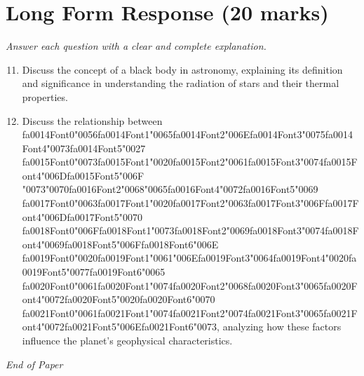 \documentclass[12pt]{article}
\begin{document}
\section*{Long Form Response (20 marks)}
\textit{Answer each question with a clear and complete explanation.}
\begin{enumerate}[label=\arabic*.]
\setcounter{enumi}{10}
\item Discuss the concept of a black body in astronomy, explaining its definition and
significance in understanding the radiation of stars and their thermal properties.
\item Discuss the relationship between {\csname fa0014Font0\endcsname\char"0056}{\csname fa0014Font1\endcsname\char"0065}{\csname fa0014Font2\endcsname\char"006E}{\csname fa0014Font3\endcsname\char"0075}{\csname fa0014Font4\endcsname\char"0073}{\csname fa0014Font5\endcsname\char"0027} {\csname fa0015Font0\endcsname\char"0073}{\csname fa0015Font1\endcsname\char"0020}{\csname fa0015Font2\endcsname\char"0061}{\csname fa0015Font3\endcsname\char"0074}{\csname fa0015Font4\endcsname\char"006D}{\csname fa0015Font5\endcsname\char"006F} {\char"0073}{\char"0070}{\csname fa0016Font2\endcsname\char"0068}{\char"0065}{\csname fa0016Font4\endcsname\char"0072}{\csname fa0016Font5\endcsname\char"0069} {\csname fa0017Font0\endcsname\char"0063}{\csname fa0017Font1\endcsname\char"0020}{\csname fa0017Font2\endcsname\char"0063}{\csname fa0017Font3\endcsname\char"006F}{\csname fa0017Font4\endcsname\char"006D}{\csname fa0017Font5\endcsname\char"0070} {\csname fa0018Font0\endcsname\char"006F}{\csname fa0018Font1\endcsname\char"0073}{\csname fa0018Font2\endcsname\char"0069}{\csname fa0018Font3\endcsname\char"0074}{\csname fa0018Font4\endcsname\char"0069}{\csname fa0018Font5\endcsname\char"006F}{\csname fa0018Font6\endcsname\char"006E} {\csname fa0019Font0\endcsname\char"0020}{\csname fa0019Font1\endcsname\char"0061}{\char"006E}{\csname fa0019Font3\endcsname\char"0064}{\csname fa0019Font4\endcsname\char"0020}{\csname fa0019Font5\endcsname\char"0077}{\csname fa0019Font6\endcsname\char"0065} {\csname fa0020Font0\endcsname\char"0061}{\csname fa0020Font1\endcsname\char"0074}{\csname fa0020Font2\endcsname\char"0068}{\csname fa0020Font3\endcsname\char"0065}{\csname fa0020Font4\endcsname\char"0072}{\csname fa0020Font5\endcsname\char"0020}{\csname fa0020Font6\endcsname\char"0070} {\csname fa0021Font0\endcsname\char"0061}{\csname fa0021Font1\endcsname\char"0074}{\csname fa0021Font2\endcsname\char"0074}{\csname fa0021Font3\endcsname\char"0065}{\csname fa0021Font4\endcsname\char"0072}{\csname fa0021Font5\endcsname\char"006E}{\csname fa0021Font6\endcsname\char"0073},
analyzing how these factors influence the planet's geophysical characteristics.
\end{enumerate}

\vfill
\noindent\textit{End of Paper}
\end{document}
